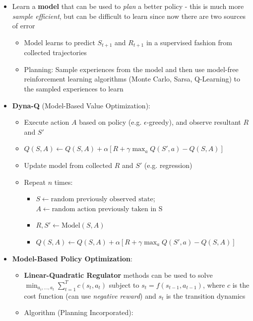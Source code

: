 \documentclass[twocolumn]{article}
\providecommand{\tightlist}{%
  \setlength{\itemsep}{\GlobalItemSep}\setlength{\parskip}{\GlobalListParSkip}}
\newlength{\GlobalItemSep}
\newlength{\GlobalListParSkip}
\begin{document}
\begin{itemize}
\tightlist
\item
  Learn a \textbf{model} that can be used to \emph{plan} a better policy
  - this is much more \emph{sample efficient}, but can be difficult to
  learn since now there are two sources of error

  \begin{itemize}
  \tightlist
  \item
    Model learns to predict \(S_{t+1}\) and \(R_{t+1}\) in a supervised
    fashion from collected trajectories
  \item
    Planning: Sample experiences from the model and then use model-free
    reinforcement learning algorithms (Monte Carlo, Sarsa, Q-Learning)
    to the sampled experiences to learn
  \end{itemize}
\item
  \textbf{Dyna-Q} (Model-Based Value Optimization):

  \begin{itemize}
  \tightlist
  \item
    Execute action \(A\) based on policy (e.g. \(\epsilon\)-greedy), and
    observe resultant \(R\) and \(S'\)
  \item
    \(Q(S,A) \leftarrow Q(S,A) + \alpha [R + \gamma \max_a Q(S', a) - Q(S, A)]\)
  \item
    Update model from collected \(R\) and \(S'\) (e.g. regression)
  \item
    Repeat \(n\) times:

    \begin{itemize}
    \tightlist
    \item
      \(S \leftarrow \text{random previously observed state}\);
      \(A \leftarrow \text{random action previously taken in S}\)
    \item
      \(R, S' \leftarrow \text{Model}(S,A)\)
    \item
      \(Q(S,A) \leftarrow Q(S,A) + \alpha [R + \gamma \max_a Q(S' ,a) - Q(S,A)]\)
    \end{itemize}
  \end{itemize}
\item
  \textbf{Model-Based Policy Optimization}:

  \begin{itemize}
  \tightlist
  \item
    \textbf{Linear-Quadratic Regulator} methods can be used to solve
    \(\min_{a_i, ..., a_t}\sum_{t=1}^T c(s_t, a_t)\) subject to
    \(s_t = f(s_{t-1}, a_{t-1})\), where \(c\) is the cost function (can
    use \emph{negative reward}) and \(s_t\) is the transition dynamics
  \item
    Algorithm (Planning Incorporated):


\end{itemize}
\end{itemize}
\end{document}
